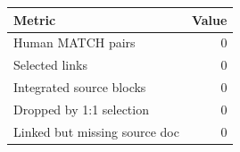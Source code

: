 \begin{tabular}{lr}
\toprule
Metric & Value \\
\midrule
Human MATCH pairs & 0 \\
Selected links & 0 \\
Integrated source blocks & 0 \\
Dropped by 1:1 selection & 0 \\
Linked but missing source doc & 0 \\
\bottomrule
\end{tabular}
